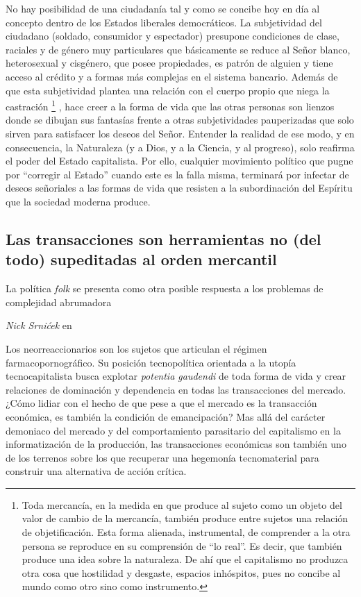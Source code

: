 No hay posibilidad de una ciudadanía tal y como se concibe hoy en día al concepto dentro de los Estados liberales democráticos. La subjetividad del ciudadano (soldado, consumidor y espectador) presupone condiciones de clase, raciales y de género muy particulares que básicamente se reduce al Señor blanco, heterosexual y cisgénero, que posee propiedades, es patrón de alguien y tiene acceso al crédito y a formas más complejas en el sistema bancario. Además de que esta subjetividad plantea una relación con el cuerpo propio que niega la castración \footnote{Toda mercancía, en la medida en que produce al sujeto como un objeto del valor de cambio de la mercancía, también produce entre sujetos una relación de objetificación. Esta forma alienada, instrumental, de comprender a la otra persona se reproduce en su comprensión de \enquote{lo real}. Es decir, que también produce una idea sobre la naturaleza. De ahí que el capitalismo no produzca otra cosa que hostilidad y desgaste, espacios inhóspitos, pues no concibe al mundo como otro sino como instrumento.} , hace creer a la forma de vida que las otras personas son lienzos donde se dibujan sus fantasías frente a otras subjetividades pauperizadas que solo sirven para satisfacer los deseos del Señor. Entender la realidad de ese modo, y en consecuencia, la Naturaleza (y a Dios, y a la Ciencia, y al progreso), solo reafirma el poder del Estado capitalista. Por ello, cualquier movimiento político que pugne por \enquote{corregir al Estado} cuando este es la falla misma, terminará por infectar de deseos señoriales a las formas de vida que resisten a la subordinación del Espíritu que la sociedad moderna produce.

\subsection{Las transacciones son herramientas no (del todo) supeditadas al orden mercantil}
\label{sub:las-transacciones-son-herramientas-no-del-todo-supeditadas-al-orden-mercantil}

\epigraph{La política \emph{folk} se presenta como otra posible respuesta a los
problemas de complejidad abrumadora}{\emph{Nick Srnićek} en~\autocite{srnicekInventarFuturoPoscapitalismo2017}}

Los neorreaccionarios son los sujetos que articulan el régimen farmacopornográfico. Su posición tecnopolítica orientada a la utopía tecnocapitalista busca explotar \emph{potentia gaudendi} de toda forma de vida y crear relaciones de dominación y dependencia en todas las transacciones del mercado. ¿Cómo lidiar con el hecho de que pese a que el mercado es la transacción económica, es también la condición de emancipación? Mas allá del carácter demoniaco del mercado y del comportamiento parasitario del capitalismo en la informatización de la producción, las transacciones económicas son también uno de los terrenos sobre los que recuperar una hegemonía tecnomaterial para construir una alternativa de acción crítica.


